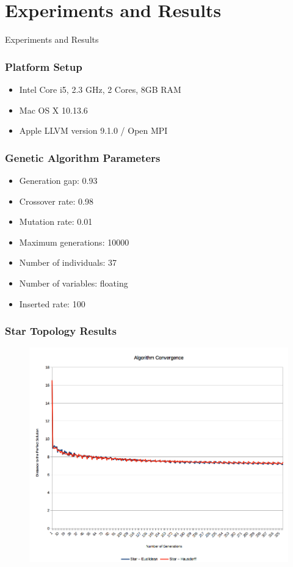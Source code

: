 \documentclass{beamer}
\begin{document}
\section{Experiments and Results}

\begin{frame}
\center \huge{Experiments and Results}
\end{frame}

\begin{frame}
\frametitle{Platform Setup}
\begin{itemize}
  \item Intel Core i5, 2.3 GHz, 2 Cores, 8GB RAM
  \item Mac OS X 10.13.6
  \item Apple LLVM version 9.1.0 / Open MPI
\end{itemize}
\end{frame}

\begin{frame}
\frametitle{Genetic Algorithm Parameters}
\begin{itemize}
  \item Generation gap: 0.93
  \item Crossover rate: 0.98
  \item Mutation rate: 0.01
  \item Maximum generations: 10000
  \item Number of individuals: 37
  \item Number of variables: floating
  \item Inserted rate: 100
\end{itemize}
\end{frame}

\begin{frame}
\frametitle{Star Topology Results}
\begin{figure}[h]
  \centering
  \includegraphics[width=1.0\textwidth,height=0.5\textwidth]{fig03}
  \label{fig03}
\end{figure}
\end{frame}
\end{document}
